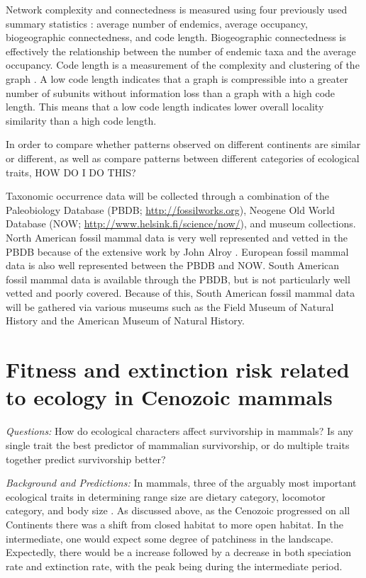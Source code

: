 \documentclass[12pt,letterpaper]{article}
\begin{document}
Network complexity and connectedness is measured using four previously used summary statistics \citep{Sidor2013}: average number of endemics, average occupancy, biogeographic connectedness, and code length. Biogeographic connectedness is effectively the relationship between the number of endemic taxa and the average occupancy. Code length is a measurement of the complexity and clustering of the graph \citep{Rosvall2008,Rosvall2010b}. A low code length indicates that a graph is compressible into a greater number of subunits without information loss than a graph with a high code length. This means that a low code length indicates lower overall locality similarity than a high code length.

In order to compare whether patterns observed on different continents are similar or different, as well as compare patterns between different categories of ecological traits, HOW DO I DO THIS?

Taxonomic occurrence data will be collected through a combination of the Paleobiology Database (PBDB; \url{http://fossilworks.org}), Neogene Old World Database (NOW; \url{http://www.helsink.fi/science/now/}), and museum collections. North American fossil mammal data is very well represented and vetted in the PBDB because of the extensive work by John Alroy \citep{Alroy1996a,Alroy1998,Alroy2000g}. European fossil mammal data is also well represented between the PBDB and NOW. South American fossil mammal data is available through the PBDB, but is not particularly well vetted and poorly covered. Because of this, South American fossil mammal data will be gathered via various museums such as the Field Museum of Natural History and the American Museum of Natural History. 


\section{Fitness and extinction risk related to ecology in Cenozoic mammals}

\textit{Questions:} How do ecological characters affect survivorship in mammals? Is any single trait the best predictor of mammalian survivorship, or do multiple traits together predict survivorship better?

\textit{Background and Predictions:} 
In mammals, three of the arguably most important ecological traits in determining range size are dietary category, locomotor category, and body size \citep{Jernvall2004,Smith2008b,Smith2004,Lyons2005,Lyons2010}. As discussed above, as the Cenozoic progressed on all Continents there was a shift from closed habitat to more open habitat. In the intermediate, one would expect some degree of patchiness in the landscape. Expectedly, there would be a increase followed by a decrease in both speciation rate and extinction rate, with the peak being during the intermediate period.
\end{document}
